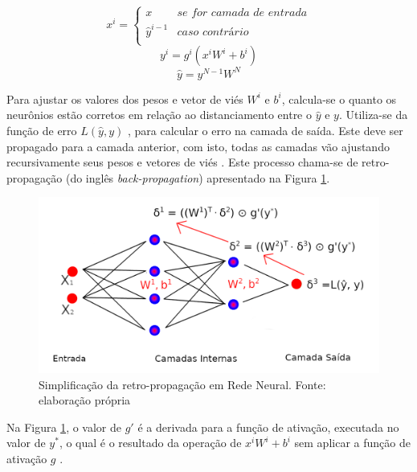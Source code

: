 \begin{displaymath}
    x^{i} = 
    \begin{cases}
      x & \textit{se for camada de entrada} \\
      \hat{y}^{i-1} & \textit{caso contrário} \\
    \end{cases}       
\end{displaymath}
\begin{equation}
	\label{eq:multilayer}
    y^{i} = g^{i}(x^{i}W^{i} + b^{i})
\end{equation}
\begin{displaymath}
    \hat{y} = y^{N-1}W^{N}
\end{displaymath}

Para ajustar os valores dos pesos e vetor de viés $W^{i}$ e $b^{i}$, calcula-se o quanto os neurônios estão corretos em relação ao distanciamento entre o $\hat{y}$ e $y$. Utiliza-se da função de erro $L(\hat{y}, y)$ \cite{goldberg_neural_2017}, para calcular o erro na camada de saída. Este deve ser propagado para a camada anterior, com isto, todas as camadas vão ajustando recursivamente seus pesos e vetores de viés \cite{nielsen_neural_2015}. Este processo chama-se de retro-propagação (do inglês \textit{back-propagation}) apresentado na Figura \ref{fig:redeNeuralBackprop}.

\begin{figure}[ht]
	\centering
    \includegraphics[keepaspectratio=true,scale=1.3]{figuras/redeNeuralBackprop}
	\caption[Retro-propagação em Rede Neural]{Simplificação da retro-propagação em Rede Neural. Fonte: elaboração própria}
	\label{fig:redeNeuralBackprop}
\end{figure}

Na Figura \ref{fig:redeNeuralBackprop}, o valor de $g'$ é a derivada para a função de ativação, executada no valor de $y^{*}$, o qual é o resultado da operação de $x^{i}W^{i} + b^{i}$ sem aplicar a função de ativação $g$ \cite{nielsen_neural_2015}.

